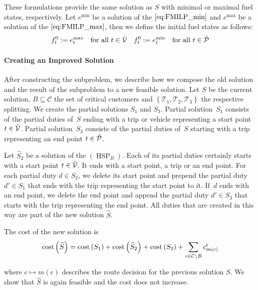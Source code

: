 These formulations provide the same solution as $S$ with minimal or maximal fuel states, respectively. Let $e^{\min}$ be a solution of the $\eqref{eq:FMILP_min}$ and $e^{\max}$ be a solution of the $\eqref{eq:FMILP_max}$, then we define the initial fuel states as follows:
\begin{align*}
	f^0_t := e^{\max}_t && \text{for all } t\in\hat{\mathcal{V}} && f^0_t := e^{\min}_t && \text{for all } t\in\hat{\mathcal{P}}
\end{align*}

\paragraph{Creating an Improved Solution} \parfill

After constructing the subproblem, we describe how we compose the old solution and the result of the subproblem to a new feasible solution. Let $S$ be the current solution, $B\subseteq\mathcal{C}$ the set of critical customers and $\left\{\mathcal{T}_1,\mathcal{T}_2,\mathcal{T}_3\right\}$ the respective splitting. We create the partial solutions $S_1$ and $S_3$. Partial solution~$S_1$ consists of the partial duties of~$S$ ending with a trip or vehicle representing a start point ${t\in\hat{\mathcal{V}}}$. Partial solution~$S_3$ consists of the partial duties of~$S$ starting with a trip representing an end point ${t\in\hat{\mathcal{P}}}$. 

Let $\widehat{S}_2$ be a solution of the $(\operatorname{HSP}_B)$. Each of its partial duties certainly starts with a start point ${t\in\hat{\mathcal{V}}}$. It ends with a start point, a trip or an end point. For each partial duty ${d\in\widehat{S}_2}$, we delete its start point and prepend the partial duty ${d'\in S_1}$ that ends with the trip representing the start point to it. If~$d$ ends with an end point,  we delete the end point and append the partial duty ${d'\in S_3}$ that starts with the trip representing the end point. All duties that are created in this way are part of the new solution $\widehat{S}$. 

The cost of the new solution is
\begin{align*}
	\operatorname{cost}\left(\widehat{S}\right) = \operatorname{cost}\left(S_1\right) + \operatorname{cost}\left(\widehat{S}_2\right) + \operatorname{cost}\left(S_3\right) + \sum_{c\in\mathcal{C}\backslash B} c^{\operatorname{r}}_{m(c)}
\end{align*}

where ${c\mapsto m(c)}$ describes the route decision for the previous solution $S$. We show that $\widehat{S}$ is again feasible and the cost does not increase.

